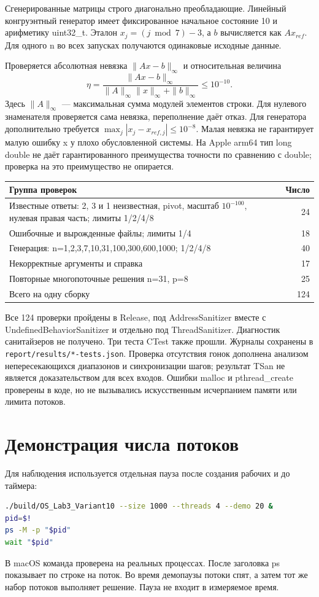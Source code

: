Сгенерированные матрицы строго диагонально преобладающие.
Линейный конгруэнтный генератор имеет фиксированное начальное состояние 10
и арифметику uint32\_t. Эталон $x_j=(j\bmod7)-3$, а $b$ вычисляется как
$Ax_{ref}$. Для одного n во всех запусках получаются одинаковые исходные данные.

Проверяется абсолютная невязка $\|Ax-b\|_\infty$ и относительная величина
\[
\eta=\frac{\|Ax-b\|_\infty}
{\|A\|_\infty\|x\|_\infty+\|b\|_\infty}\le10^{-10}.
\]
Здесь $\|A\|_\infty$ --- максимальная сумма модулей элементов строки.
Для нулевого знаменателя проверяется сама невязка, переполнение даёт отказ.
Для генератора дополнительно требуется $\max_j|x_j-x_{ref,j}|\le10^{-8}$.
Малая невязка не гарантирует малую ошибку x у плохо обусловленной системы.
На Apple arm64 тип long double не даёт гарантированного преимущества
точности по сравнению с double; проверка на это преимущество не опирается.

\begin{center}
\begin{tabular}{p{10.7cm}r}
\hline
Группа проверок & Число\\\hline
Известные ответы: 2, 3 и 1 неизвестная, pivot, масштаб $10^{-100}$,
нулевая правая часть; лимиты 1/2/4/8 & 24\\
Ошибочные и вырожденные файлы; лимиты 1/4 & 18\\
Генерация: n=1,2,3,7,10,31,100,300,600,1000; 1/2/4/8 & 40\\
Некорректные аргументы и справка & 17\\
Повторные многопоточные решения n=31, p=8 & 25\\\hline
Всего на одну сборку & 124\\\hline
\end{tabular}
\end{center}
Все 124 проверки пройдены в Release, под AddressSanitizer вместе с
UndefinedBehaviorSanitizer и отдельно под ThreadSanitizer.
Диагностик санитайзеров не получено. Три теста CTest также прошли.
Журналы сохранены в \texttt{report/results/*-tests.json}.
Проверка отсутствия гонок дополнена анализом непересекающихся диапазонов
и синхронизации шагов; результат TSan не является доказательством для всех входов.
Ошибки malloc и pthread\_create проверены в коде, но не вызывались
искусственным исчерпанием памяти или лимита потоков.

\section{Демонстрация числа потоков}
Для наблюдения используется отдельная пауза после создания рабочих и до таймера:
\begin{lstlisting}[language=bash,numbers=none,basicstyle=\small\ttfamily]
./build/OS_Lab3_Variant10 --size 1000 --threads 4 --demo 20 &
pid=$!
ps -M -p "$pid"
wait "$pid"
\end{lstlisting}
В macOS команда проверена на реальных процессах. После заголовка ps показывает
по строке на поток. Во время демопаузы потоки спят, а затем тот же набор
потоков выполняет решение. Пауза не входит в измеряемое время.

